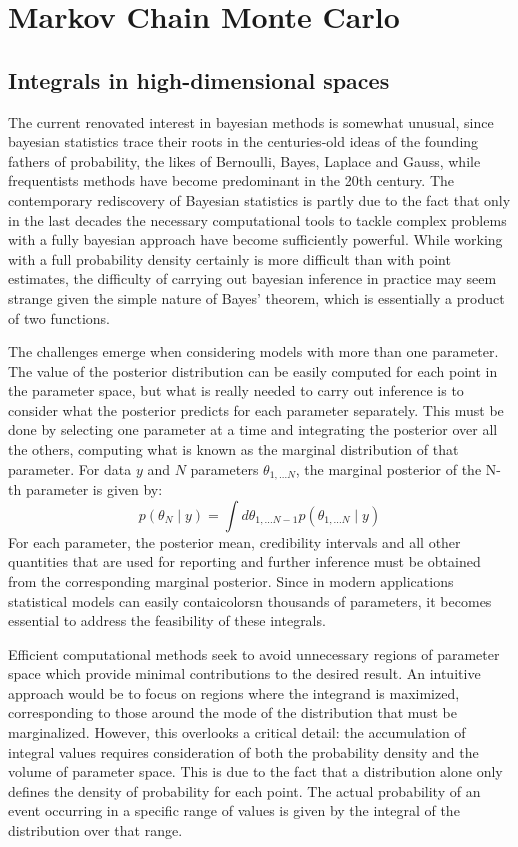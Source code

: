 \section{Markov Chain Monte Carlo}

\subsection{Integrals in high-dimensional spaces}
The current renovated interest in bayesian methods is somewhat unusual,
since bayesian statistics trace their roots in the centuries-old ideas of the founding
fathers of probability, the likes of Bernoulli, Bayes, Laplace and Gauss, while frequentists methods have become
predominant in the 20th century.
The contemporary rediscovery of Bayesian statistics is partly due to the fact that only in the last decades the necessary computational tools to tackle complex problems with a fully bayesian approach have become sufficiently powerful.
While working with a full probability density certainly is more difficult than with point estimates, the difficulty of
carrying out bayesian inference in practice may seem strange given the simple nature of Bayes' theorem, which is essentially a product of two functions.

The challenges emerge when considering models with more than one parameter. The value of the
posterior distribution can be easily computed for each point in the parameter space, but what is really needed to carry out
inference is to consider what the posterior predicts for each parameter separately. This must be done by selecting one
parameter at a time and integrating the posterior over all the others, computing what is known as the marginal
distribution of that parameter. For data $y$ and $N$ parameters $\theta_{1,\ldots N}$, the marginal posterior of the N-th parameter is given by:
\begin{equation}
    p(\theta_N \mid y)=\int d\theta_{1,\ldots N-1} p(\theta_{1,\ldots N}\mid y)
    \label{eq:marginal}
\end{equation}
For each parameter, the posterior mean, credibility intervals and all other quantities that are used for reporting and further inference must be obtained from the corresponding marginal posterior.
Since in modern applications statistical models can easily contaicolorsn thousands of parameters, it becomes essential to
address the feasibility of these integrals. 

Efficient computational methods seek to avoid unnecessary regions of parameter space which provide minimal contributions to the desired result.
An intuitive approach would be to focus on regions where the integrand is maximized, corresponding to those around the mode of
the distribution that must be marginalized. However, this overlooks a critical detail: the accumulation of integral
values requires consideration of both the probability density and the volume of parameter space.
This is due to the fact that a distribution alone only defines the density of probability for each point. The actual
probability of an event occurring in a specific range of values is given by the integral of the distribution over that range.

